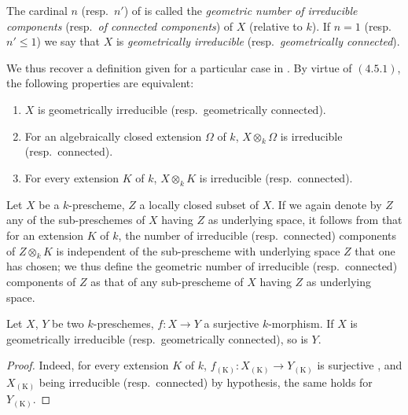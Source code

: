 \begin{definition}[4.5.2]
\label{IV.4.5.2}
The cardinal $n$ (resp.\ $n'$) of  is called the \emph{geometric number of irreducible components} (resp.\ \emph{of connected components}) of $X$ (relative to $k$).
If $n=1$ (resp.\ $n'\leq 1$) we say that $X$ is \emph{geometrically irreducible} (resp.\ \emph{geometrically connected}).
\end{definition}

We thus recover a definition given for a particular case in .
By virtue of $(4.5.1)$, the following properties are equivalent:
\begin{enumerate}[label=\emph{\alph*)}]
  \item $X$ is geometrically irreducible (resp.\ geometrically connected).
  \item For an algebraically closed extension $\Omega$ of $k$, $X\otimes_k\Omega$ is irreducible (resp.\ connected).
  \item For every extension $K$ of $k$, $X\otimes_k K$ is irreducible (resp.\ connected).
\end{enumerate}

\begin{env}[4.5.3]
\label{IV.4.5.3}
Let $X$ be a $k$-prescheme, $Z$ a locally closed subset of $X$.
If we again denote by $Z$ any of the sub-preschemes of $X$ having $Z$ as underlying space, it follows from  that for an extension $K$ of $k$, the number of irreducible (resp.\ connected) components of $Z\otimes_k K$ is independent of the sub-prescheme with underlying space $Z$ that one has chosen; we thus define the geometric number of irreducible (resp.\ connected) components of $Z$ as that of any sub-prescheme of $X$ having $Z$ as underlying space.
\end{env}

\begin{proposition}[4.5.4]
\label{IV.4.5.4}
Let $X$, $Y$ be two $k$-preschemes, $f:X\to Y$ a surjective $k$-morphism.
If $X$ is geometrically irreducible (resp.\ geometrically connected), so is $Y$.
\end{proposition}

\begin{proof}
Indeed, for every extension $K$ of $k$, $f_{(\mathrm{K})}:X_{(\mathrm{K})}\to Y_{(\mathrm{K})}$ is surjective , and $X_{(\mathrm{K})}$ being irreducible (resp.\ connected) by hypothesis, the same holds for $Y_{(\mathrm{K})}$.
\end{proof}

